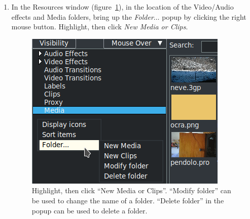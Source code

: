 \begin{enumerate}
    \item In the Resources window (figure~\ref{fig:folder_resources}), in the location of the Video/Audio effects and Media folders, bring up the \textit{Folder}$\dots$ popup by clicking the right mouse button.  
        Highlight, then click \textit{New Media or Clips}.
        \begin{figure}[htpb]
            \begin{minipage}{.55\linewidth}
                \centering
                \includegraphics[width=0.9\linewidth]{images/folder_resources.png}
                \caption{Highlight, then click “New Media or Clips”.
                    “Modify folder” can be used to   change the name of a folder.
                    “Delete folder” in the popup can be used to delete a folder.
                }
                \label{fig:folder_resources}
            \end{minipage}
            \hfill
            \begin{minipage}{.35\linewidth}
                \centering
                \vspace{18ex}


\end{minipage}
\end{figure}
\end{enumerate}
